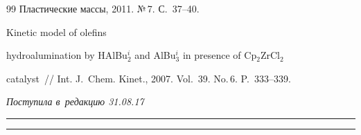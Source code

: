 {{\begin{thebibliography}{99}
Пластические массы, 2011. №\,7. С.~37--40. 


 Kinetic model of olefins 

hydroalumination by HAlBu$_2^i$ and AlBu$_3^i$ in presence of Cp$_2$ZrCl$_2$ 

catalyst~/\!\!/ Int. J.~Chem. Kinet., 2007. Vol.~39. No.\,6. P.~333--339.

        \end{thebibliography}

} }





\vspace*{-3pt}



\hfill{\small\textit{Поступила в~редакцию 31.08.17}}









\vspace*{8pt}



\hrule



\vspace*{2pt}









\hrule










\def\tit{INFORMATIVITY OF A~KINETIC EXPERIMENT AND~UNCERTAINTY REGIONS OF~KINETIC 

MODEL}



\def\titkol{Informativity of a~kinetic experiment and~uncertainty regions of~kinetic 

model}





